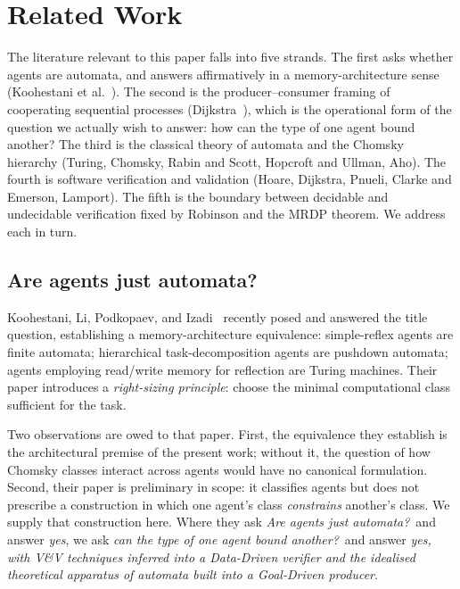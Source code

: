 \section{Related Work}
\label{sec:related}

The literature relevant to this paper falls into five strands.
The first asks whether agents are automata, and answers
affirmatively in a memory-architecture sense
(Koohestani et al.~\cite{koohestani2025automata}).  The second is
the producer--consumer framing of cooperating sequential
processes (Dijkstra~\cite{dijkstra1968cooperating}), which is
the operational form of the question we actually wish to answer:
how can the type of one agent bound another?  The third is the
classical theory of automata and the Chomsky hierarchy (Turing,
Chomsky, Rabin and Scott, Hopcroft and Ullman, Aho).  The fourth
is software verification and validation (Hoare, Dijkstra, Pnueli,
Clarke and Emerson, Lamport).  The fifth is the boundary
between decidable and undecidable verification fixed by Robinson
and the MRDP theorem.  We address each in turn.

\subsection{Are agents just automata?}

Koohestani, Li, Podkopaev, and Izadi~\cite{koohestani2025automata}
recently posed and answered the title question, establishing a
memory-architecture equivalence: simple-reflex agents are finite
automata; hierarchical task-decomposition agents are pushdown
automata; agents employing read/write memory for reflection are
Turing machines.  Their paper introduces a \emph{right-sizing
principle}: choose the minimal computational class sufficient
for the task.

Two observations are owed to that paper.  First, the equivalence
they establish is the architectural premise of the present work;
without it, the question of how Chomsky classes interact across
agents would have no canonical formulation.  Second, their paper
is preliminary in scope: it classifies agents but does not
prescribe a construction in which one agent's class
\emph{constrains} another's class.  We supply that construction
here.  Where they ask \emph{Are agents just automata?}\ and
answer \emph{yes}, we ask \emph{can the type of one agent bound
another?}\ and answer \emph{yes, with V\&V techniques inferred
into a Data-Driven verifier and the idealised theoretical
apparatus of automata built into a Goal-Driven producer}.

